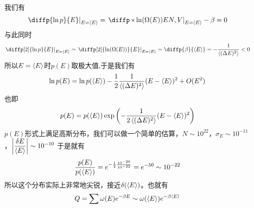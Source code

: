 我们有\begin{equation}
     \left.  \diffp{\ln p}{E}\right|_{E=\braket{E}} =\left. \diffp*{\ln(\Omega(E))}{E}{N,V}\right|_{E=\braket{E}}-\beta=0
\end{equation}
与此同时\begin{equation}
       \left. \diffp[2]{\ln p}{E}\right|_{E=\braket{E}}=\left. \diffp[2]{\ln(\Omega(E))}{E}\right|_{E=\braket{E}}=\diffp{\beta}{{\braket{E}}}=-\frac{1}{\braket{(\Delta E)^2}}< 0
\end{equation}
所以$E=\braket{E}$时$p(E)$取极大值,于是我们有\begin{equation}
       \ln p(E)=\ln p(\braket{E})-\frac{1}{2}\frac{1}{\braket{(\Delta E)^2}}(E-\braket{E})^2+O(E^2)
\end{equation}
也即\begin{equation}
       p(E)=p(\braket{E})\exp\left(-\frac{1}{2\braket{(\Delta E)^2}}(E-\braket{E})^2\right)
\end{equation}
$p(E)$形式上满足高斯分布，我们可以做一个简单的估算，$N\sim 10^{22}$，$\sigma_E\sim 10^{-11}$，$\displaystyle \left|\frac{\delta E}{\braket{E}}\right|\sim 10^{-10}$
于是就有\begin{equation}
       \frac{p(E)}{p(\braket{E})}=e^{-\frac{1}{2} \frac{10^{-20}}{10^{-22}}}=e^{-50}\sim 10^{-22}
\end{equation}
所以这个分布实际上非常地尖锐，接近$\delta(\braket{E})$。也就有\begin{equation}
       Q=\sum \omega(E) e^{-\beta E}\sim \omega(\braket{E}) e^{-\beta \braket{E}}
\end{equation}
